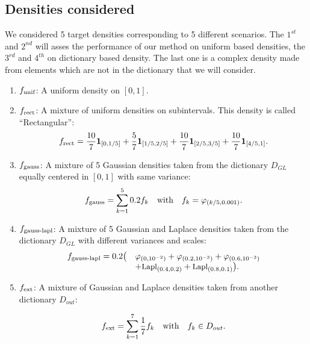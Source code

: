 \subsection{Densities considered}
We considered 5 target densities corresponding to 5 different scenarios. The $1^{st}$ and $2^{nd}$ will asses the performance of our method on uniform based densities, the $3^{rd}$ and $4^{th}$ on dictionary based density. The last one is a complex density made from elements which are not in the dictionary that we will consider.
\begin{enumerate}
\item{$f_{\textnormal{unif}}$:} A uniform density on $[0,1]$.
\item{$f_{\textnormal{rect}}$:} A mixture of uniform densities on subintervals. This density is called ``Rectangular'':
\begin{equation}
    f_{\textnormal{rect}}=\frac{10}{7}\b1_{[0,1/5]}+\frac{5}{7}\b1_{[1/5,2/5]}+
    \frac{10}{7}\b1_{[2/5,3/5]}+\frac{10}{7}\b1_{[4/5,1]}.
\end{equation}
\item{$f_{\textnormal{gauss}}$:} A mixture of 5 Gaussian densities taken from the dictionary $D_{GL}$ equally centered in $[0,1]$ with same variance:
\begin{equation}
    f_{\textnormal{gauss}}=\sum_{k=1}^5 0.2f_{k} \quad \text{with}\quad f_k=\varphi_{(k/5,0.001)}.
\end{equation}

\item{$f_{\textnormal{gauss-lapl}}$:} A mixture of 5 Gaussian and Laplace densities taken from the dictionary $D_{GL}$ with different variances and scales:
\begin{equation}
\begin{array}{ll}
f_{\textnormal{gauss-lapl}}=0.2\big(&\varphi_{(0 ,10^{-2})} + \varphi_{(0.2,10^{-3})}+\varphi_{(0.6,10^{-3})}\\
    &+\text{\small Lapl}_{(0.4,0.2)}+\text{\small Lapl}_{(0.8,0.1)} \big).
\end{array}
\end{equation}
\item{$f_{\textnormal{ext}}$:} A mixture of Gaussian and Laplace densities taken from another dictionary $D_{out}$:

\begin{equation}
    f_{\textnormal{ext}}=\sum_{k=1}^7 \frac{1}{7}f_{k} \quad \text{with}\quad f_k\in D_{out}.
\end{equation}
\end{enumerate}
